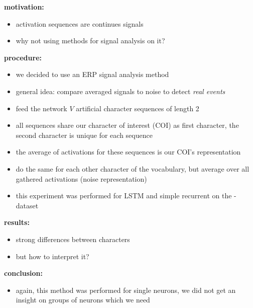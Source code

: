 \begin{frame}{\expix}
	\textbf{motivation:}
	\begin{itemize}
		\item activation sequences are continues signals
		\item why not using methods for signal analysis on it?
	\end{itemize}
	\textbf{procedure:}
	\begin{itemize}
		\item we decided to use an ERP signal analysis method
		\item general idea: compare averaged signals to noise to detect \textit{real events}
		\item feed the network $V$ artificial character sequences of length 2
		\item all sequences share our character of interest (COI) as first character, the second character is unique for each sequence
		\item the average of activations for these sequences is our COI's representation
		\item do the same for each other character of the vocabulary, but average over all gathered activations (noise representation)
		\item this experiment was performed for LSTM and simple recurrent on the \lk -dataset
	\end{itemize}
	\textbf{results:}
	\begin{itemize}
		\item strong differences between characters
		\item but how to interpret it?
	\end{itemize}
	\textbf{conclusion:}
	\begin{itemize}
		\item again, this method was performed for single neurons, we did not get an insight on groups of neurons which we need
	\end{itemize}
\end{frame}
